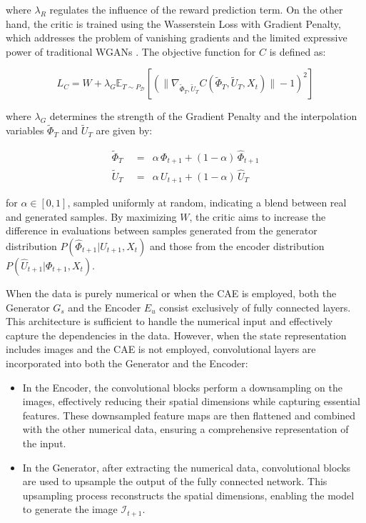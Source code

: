 where \( \lambda_R \) regulates the influence of the reward
prediction term. On the other hand, the critic is trained
using the Wasserstein Loss with Gradient Penalty,
which addresses the problem of vanishing gradients and
the limited expressive power of traditional WGANs \cite{gulrajani2017}.
The objective function for \( C \) is defined as:

\begin{equation}
L_C = W + \lambda_G \mathbb{E}_{T \sim P_{\mathcal{D}}}
\left[ (\| \nabla_{\tilde{\Phi}_T, \tilde{U}_T} C(\tilde{\Phi}_T,
\tilde{U}_T, X_t) \| - 1)^2 \right]
\end{equation}

where \( \lambda_G \) determines the strength of the Gradient Penalty
and the interpolation variables \( \tilde{\Phi}_T \) and \( \tilde{U}_T \)
are given by:

\[
    \begin{aligned}
        \tilde{\Phi}_T \;\; &=& \alpha \, \Phi_{t+1} + (1 - \alpha) \, \hat{\Phi}_{t+1} \\ 
        \tilde{U}_T \;\; &=& \alpha \, U_{t+1} + (1 - \alpha) \, \hat{U}_T
    \end{aligned}
\]

for \( \alpha \in [0, 1] \), sampled uniformly at random,
indicating a blend between real and generated samples.
By maximizing \( W \), the critic aims to increase the difference
in evaluations between samples generated from the generator distribution
\( P(\hat{\Phi}_{t+1} | U_{t+1}, X_t) \) and those from the encoder
distribution \( P(\hat{U}_{t+1} | \Phi_{t+1}, X_t) \).

When the data is purely numerical or when the
CAE is employed, both the Generator $G_s$ and the
Encoder $E_u$ consist exclusively of fully connected
layers. This architecture is sufficient to handle
the numerical input and effectively capture the dependencies
in the data. However, when the state representation
includes images and the CAE is not employed,
convolutional layers are incorporated
into both the Generator and the Encoder:
\begin{itemize}
    \item In the Encoder, the convolutional blocks perform a
    downsampling on the images, effectively reducing their
    spatial dimensions while capturing essential features.
    These downsampled feature maps are then flattened
    and combined with the other numerical data,
    ensuring a comprehensive representation of the input.

    \item In the Generator, after extracting the numerical data,
    convolutional blocks are used to upsample the output of
    the fully connected network. This upsampling process
    reconstructs the spatial dimensions,
    enabling the model to generate the image $\mathcal{I}_{t+1}$.
\end{itemize}

